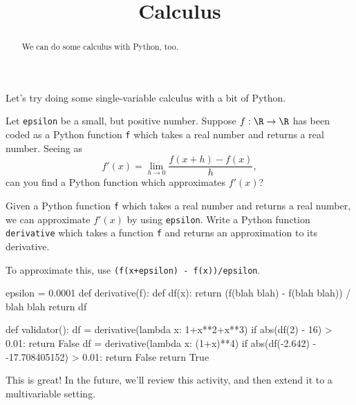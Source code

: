 \documentclass{ximera}
\title{Calculus}
\begin{document}
\begin{abstract}
  We can do some calculus with Python, too.
\end{abstract}

Let's try doing some single-variable calculus with a bit of Python.

Let \texttt{epsilon} be a small, but positive number.  Suppose $f:\R
\to \R$ has been coded as a Python function \texttt{f} which takes a
real number and returns a real number.  Seeing as
$$
f'(x) = \lim_{h \to 0} \frac{f(x+h) - f(x)}{h},
$$
can you find a Python function which approximates $f'(x)$?

Given a Python function \texttt{f} which takes a real number and
returns a real number, we can approximate $f'(x)$ by using
\texttt{epsilon}.  Write a Python function \texttt{derivative} which
takes a function \texttt{f} and returns an approximation to its
derivative.

\begin{solution}
  \begin{hint}
    To approximate this, use \texttt{(f(x+epsilon) - f(x))/epsilon}.
  \end{hint}
\begin{python}
epsilon = 0.0001
def derivative(f):
  def df(x): return (f(blah blah) - f(blah blah)) / blah blah
  return df

def validator():
  df = derivative(lambda x: 1+x**2+x**3)
  if abs(df(2) - 16) > 0.01:
    return False
  df = derivative(lambda x: (1+x)**4)
  if abs(df(-2.642) - -17.708405152) > 0.01:
    return False
  return True
\end{python}
This is great!  In the future, we'll review this activity, and then extend it to a multivariable setting.
\end{solution}









\end{document}
